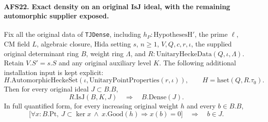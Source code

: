 \paragraph{AFS22. Exact density on an original IsJ ideal, with the remaining automorphic supplier exposed.}
\label{claim:AFS22}
Fix all the original data of \texttt{TJDense}, including
$h_P:\mathrm{HypothesesH'}$, the prime $\ell$, CM field
$L$, algebraic closure, Hida setting $s$, $n\geq1$,
$V,Q,c,r,\iota$, the supplied original determinant ring
$B$, weight ring $\Lambda$, and
$R:\mathrm{UnitaryHeckeData}(Q,\iota,\Lambda)$.
Retain $V.S'=s.S$ and any original auxiliary level $K$.
The following additional installation input is kept
explicit:
\begin{equation}\label{eq:afs-aut-input}
 H.\mathrm{AutomorphicHeckeSet}
       (\iota,\mathrm{UnitaryPointProperties}(r,\iota)),
             \qquad H=\mathrm{hset}(Q,R.\tau_0).
\end{equation}
Then for every original ideal $J\subset B.B$,
\[
            R.\mathrm{IsJ}(B,K,J)\quad\Longrightarrow\quad
                                      B.\mathrm{Dense}(J).
\]
In full quantified form, for every increasing original
weight $h$ and every $b\in B.B$,
\[
 \bigl[\forall x:B.\mathrm{Pt},\ J\subset\ker x
              \ \land\ x.\mathrm{Good}(h)\Rightarrow x(b)=0\bigr]
                                      \quad\Longrightarrow\quad b\in J.
\]
